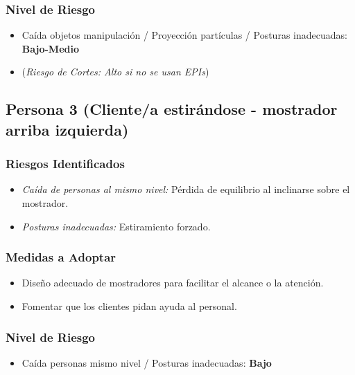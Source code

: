 \documentclass[12pt,a4paper]{article}
\begin{document}
	\subsubsection{Nivel de Riesgo}
	\begin{itemize}
		\item Caída objetos manipulación / Proyección partículas / Posturas inadecuadas: \textbf{Bajo-Medio}
		\item (\textit{Riesgo de Cortes: Alto si no se usan EPIs})
	\end{itemize}
	
	\bigskip\hrulefill\bigskip
	
	\subsection{Persona 3 (Cliente/a estirándose - mostrador arriba izquierda)}
	
	\subsubsection{Riesgos Identificados}
	\begin{itemize}
		\item \textit{Caída de personas al mismo nivel:} Pérdida de equilibrio al inclinarse sobre el mostrador.
		\item \textit{Posturas inadecuadas:} Estiramiento forzado.
	\end{itemize}
	
	\subsubsection{Medidas a Adoptar}
	\begin{itemize}
		\item Diseño adecuado de mostradores para facilitar el alcance o la atención.
		\item Fomentar que los clientes pidan ayuda al personal.
	\end{itemize}
	
	\subsubsection{Nivel de Riesgo}
	\begin{itemize}
		\item Caída personas mismo nivel / Posturas inadecuadas: \textbf{Bajo}
	\end{itemize}
	
	\bigskip\hrulefill\bigskip
	
\end{document}
